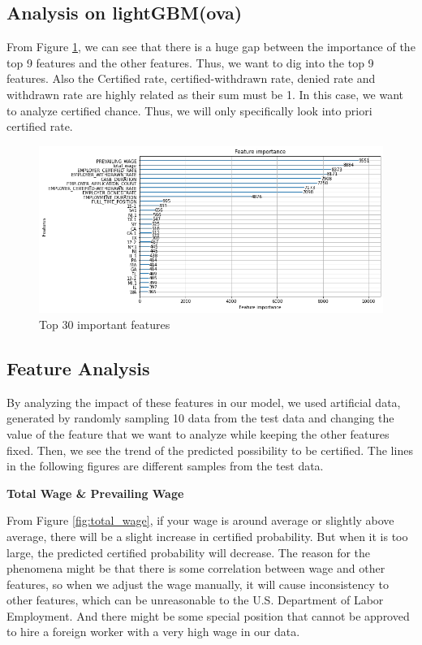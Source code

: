 \documentclass{article}
\begin{document}
\subsection{Analysis on lightGBM(ova)} 
From Figure \ref{fig:importance}, we can see that there is a huge gap between the importance of the top 9 features and the other features. Thus, we want to dig into the top 9 features. Also the Certified rate, certified-withdrawn rate, denied rate and withdrawn rate are highly related as their sum must be 1. In this case, we want to analyze certified chance. Thus, we will only specifically look into priori certified rate. 
\begin{figure}[H]
    \centering
    \includegraphics[width= .8\textwidth]{output_106.png}
    \caption{Top 30 important features}
    \label{fig:importance}
\end{figure}
\subsection{Feature Analysis}
By analyzing the impact of these features in our model, we used artificial data, generated by randomly sampling 10 data from the test data and changing the value of the feature that we want to analyze while keeping the other features fixed. Then, we see the trend of the predicted possibility to be certified. The lines in the following figures are different samples from the test data. 

\noindent\textbf{Total Wage \& Prevailing Wage}

From Figure \ref{fig:total_wage}, if your wage is around average or slightly above average, there will be a slight increase in certified probability. But when it is too large, the predicted certified probability will decrease. The reason for the phenomena might be that there is some correlation between wage and other features, so when we adjust the wage manually, it will cause inconsistency to other features, which can be unreasonable to the U.S. Department of Labor Employment. And there might be some special position that cannot be approved to hire a foreign worker with a very high wage in our data.  
\end{document}
